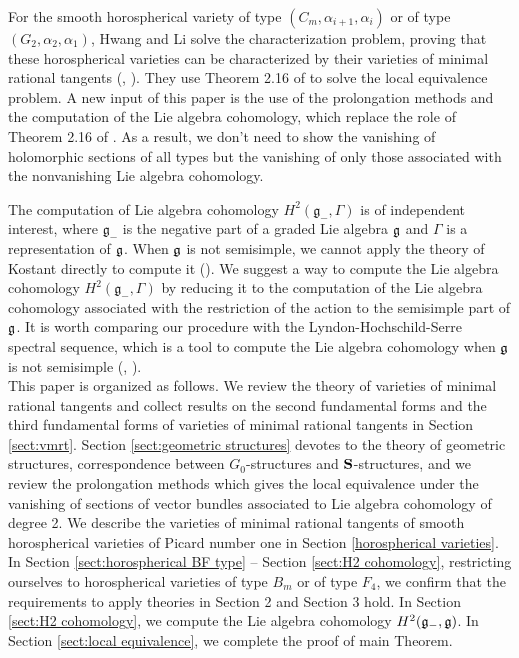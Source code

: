 \documentclass[12pt]{amsart}
\theoremstyle{plain}
\theoremstyle{definition}
\begin{document}
For the smooth horospherical variety of type $(C_m, \alpha_{i+1}, \alpha_i)$ or of type $(G_2, \alpha_2, \alpha_1)$,  Hwang and   Li  solve the characterization problem,  proving   that these horospherical varieties can be characterized by their varieties of minimal rational tangents (\cite{HL19}, \cite{HL21}).  They use  Theorem 2.16 of \cite{HL19}  to solve the local equivalence problem.
A new input of this paper is the use of the prolongation methods   and the computation of the Lie algebra cohomology, which replace  the role of Theorem 2.16 of \cite{HL19}.
As a result, we don't need to show the vanishing of holomorphic sections of all types but  the vanishing of only those associated with the nonvanishing Lie algebra cohomology. 

The computation of Lie algebra cohomology $H^2(\mathfrak g_-, \Gamma)$ is of independent interest, where $\mathfrak g_-$ is the negative part of a graded Lie algebra $\frak g$ and $\Gamma$ is a representation of $\frak g$. When $\frak g$ is not semisimple, we cannot apply the theory of Kostant directly to compute it (\cite{Ko61}). We suggest a way to compute the Lie algebra cohomology $H^2(\mathfrak g_-, \Gamma)$ by reducing it to the computation of  the Lie algebra cohomology associated with the restriction of the action to the semisimple part of $\frak g$. It is worth comparing our procedure with the Lyndon-Hochschild-Serre spectral sequence, which is a tool to compute the Lie algebra cohomology when $\frak g$ is not semisimple (\cite{HS53}, \cite{HS73}). \\


This paper is organized as follows.
We review the theory of varieties of minimal rational tangents and collect results on the second fundamental forms and the third fundamental forms of varieties of minimal rational tangents in Section \ref{sect:vmrt}. Section \ref{sect:geometric structures} devotes to the theory of geometric structures, correspondence between $G_0$-structures and ${\bf S}$-structures, and we review the prolongation methods which gives  the local  equivalence under the vanishing of sections of vector bundles associated to Lie algebra cohomology of degree 2. We describe the varieties of minimal rational tangents of smooth horospherical varieties of Picard number one in Section  \ref{horospherical varieties}.
In Section \ref{sect:horospherical BF type} -- Section \ref{sect:H2 cohomology},   restricting ourselves to horospherical varieties of type $B_m$ or of type $F_4$, we confirm that the requirements to apply   theories in Section 2 and Section 3 hold. In Section \ref{sect:H2 cohomology}, we  compute the Lie algebra cohomology $H^2(\frak g_-, \frak g)$.
In Section \ref{sect:local equivalence}, we complete the proof of main Theorem.\\
\end{document}
